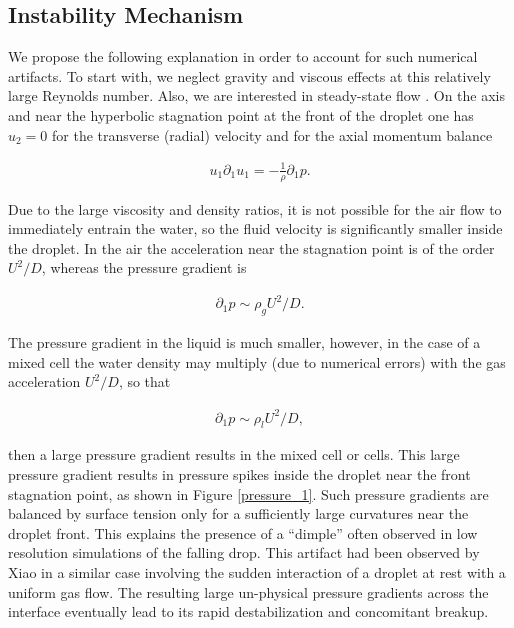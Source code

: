 \subsection*{Instability Mechanism}

We propose the following explanation in order to account for such numerical artifacts. 
To start with, we neglect gravity and viscous effects at this relatively large Reynolds number. 
Also, we are interested in steady-state flow 
. 
On the axis and near the hyperbolic stagnation point 
at the front of the droplet one has $u_2=0$ for the transverse 
(radial) velocity and for the axial momentum balance


\begin{align}
u_1 \partial_1 u_1 = - \frac 1 \rho \partial_1 p.
\end{align}

Due to the large viscosity and density ratios, it is not possible for 
the air flow to immediately entrain the water, so the fluid velocity 
is significantly smaller inside the droplet. 
In the air the acceleration near the stagnation point is 
of the order $U^2/D$, whereas the pressure gradient is

\begin{align}
\partial_1 p \sim \rho_{g} U^2/D.
\end{align}

The pressure gradient in the liquid is much smaller, 
however, in the case of a mixed cell the water density 
may multiply (due to numerical errors) with the gas acceleration $U^2/D$, so that

\begin{align}
\partial_1 p \sim \rho_{l} U^2/D,
\end{align}

then a large pressure gradient results in the mixed cell or cells. 
This large pressure gradient results in pressure spikes inside the 
droplet near the front stagnation point, as shown in Figure \ref{pressure_1}. 
Such pressure gradients are balanced by surface tension only for a sufficiently 
large curvatures near the droplet front. 
This explains the presence of a ``dimple'' often observed in low 
resolution simulations of the falling drop. 
This artifact had been observed by Xiao \cite{xiao2012} in a similar case
involving the sudden interaction of a droplet at rest with a uniform gas flow. 
The resulting large un-physical pressure gradients across the interface 
eventually lead to its rapid destabilization and concomitant breakup.  


